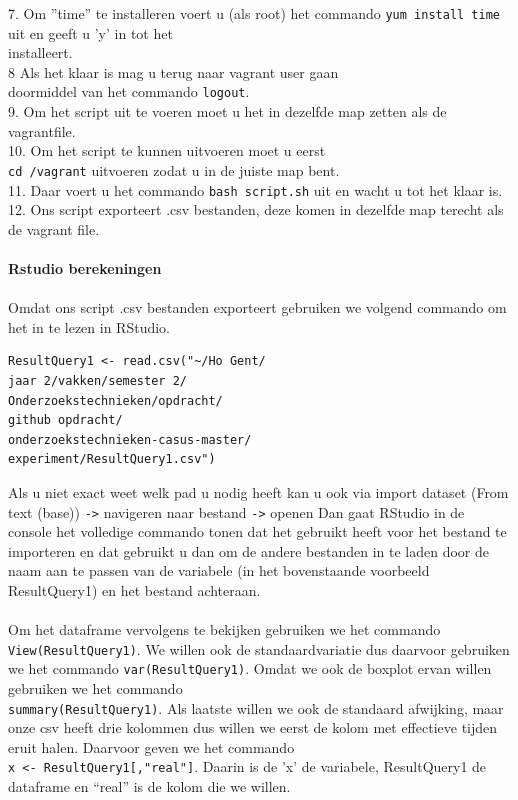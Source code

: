\documentclass[fleqn,10pt]{artikeltin}
\begin{document}
7. Om ''time'' te installeren voert u (als root) het commando \verb|yum install time| uit en geeft u 'y' in tot het \\installeert.\\
8 Als het klaar is mag u terug naar vagrant user gaan \\doormiddel van het commando \verb|logout|. \\
9. Om het script uit te voeren moet u het in dezelfde map zetten als de vagrantfile.\\
10. Om het script te kunnen uitvoeren moet u eerst\\ \verb|cd /vagrant| uitvoeren zodat u in de juiste map bent.\\
11. Daar voert u het commando \verb|bash script.sh| uit en wacht u tot het klaar is.\\
12. Ons script exporteert .csv bestanden, deze komen in dezelfde map terecht als de vagrant file.\\\\
\textbf{Rstudio berekeningen}\\\\
Omdat ons script .csv bestanden exporteert gebruiken we volgend commando om het in te lezen in RStudio.
\begin{lstlisting}
ResultQuery1 <- read.csv("~/Ho Gent/
jaar 2/vakken/semester 2/
Onderzoekstechnieken/opdracht/
github opdracht/
onderzoekstechnieken-casus-master/
experiment/ResultQuery1.csv")
\end{lstlisting}
Als u niet exact weet welk pad u nodig heeft kan u ook via import dataset (From text (base)) \verb|->| navigeren naar bestand \verb|->| openen
Dan gaat RStudio in de console het volledige commando tonen dat het gebruikt heeft voor het bestand te importeren en dat gebruikt u dan om de andere bestanden in te laden door de naam aan te passen van de variabele (in het bovenstaande voorbeeld ResultQuery1) en het bestand achteraan.\\\\
Om het dataframe vervolgens te bekijken gebruiken we het commando \verb|View(ResultQuery1)|.
We willen ook de standaardvariatie dus daarvoor gebruiken we het commando \verb|var(ResultQuery1)|.
Omdat we ook de boxplot ervan willen gebruiken we het commando \\\verb|summary(ResultQuery1)|.
Als laatste willen we ook de standaard afwijking, maar onze csv heeft drie kolommen dus willen we eerst de kolom met effectieve tijden eruit halen. Daarvoor geven we het commando \\\verb|x <- ResultQuery1[,"real"]|. Daarin is de 'x' de variabele, ResultQuery1 de dataframe en ``real'' is de kolom die we willen.
\end{document}

